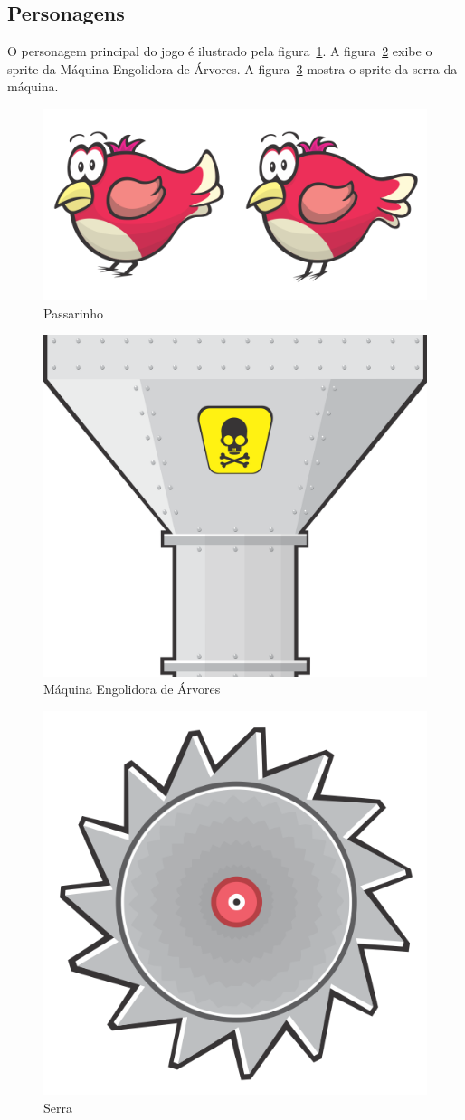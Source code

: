 \documentclass[12pt]{article}
\begin{document}
\subsection{Personagens}
	O personagem principal do jogo é ilustrado pela figura~\ref{fig:passarinho}.	A figura~\ref{fig:maq} exibe o sprite da Máquina Engolidora de Árvores. A figura~\ref{fig:saw} mostra o sprite da serra da máquina.
	
	\begin{figure}[ht]
		\centering
		\includegraphics[width=.5\textwidth]{imagens/Player}
		\caption{Passarinho}
		\label{fig:passarinho}
	\end{figure}
	
	\begin{figure}[ht]
		\centering
		\includegraphics[width=.5\textwidth]{imagens/Machine}
		\caption{Máquina Engolidora de Árvores}
		\label{fig:maq}
	\end{figure}
			
	\begin{figure}[ht]
		\centering
		\includegraphics[width=.5\textwidth]{imagens/Saw}
		\caption{Serra}
		\label{fig:saw}
	\end{figure}
\end{document}
